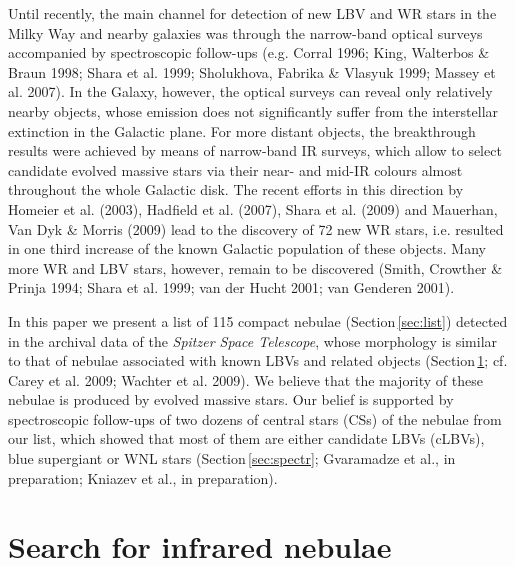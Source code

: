 \documentclass[useAMS]{mn2e}
\begin{document}
Until recently, the main channel for detection of new LBV and WR
stars in the Milky Way and nearby galaxies was through the
narrow-band optical surveys accompanied by spectroscopic follow-ups
(e.g. Corral 1996; King, Walterbos \& Braun 1998; Shara et al. 1999;
Sholukhova, Fabrika \& Vlasyuk 1999; Massey et al. 2007). In the
Galaxy, however, the optical surveys can reveal only relatively
nearby objects, whose emission does not significantly suffer from
the interstellar extinction in the Galactic plane. For more distant
objects, the breakthrough results were achieved by means of
narrow-band IR surveys, which allow to select candidate evolved
massive stars via their near- and mid-IR colours almost throughout
the whole Galactic disk. The recent efforts in this direction by
Homeier et al. (2003), Hadfield et al. (2007), Shara et al. (2009)
and Mauerhan, Van Dyk \& Morris (2009) lead to the discovery of 72
new WR stars, i.e. resulted in one third increase of the known
Galactic population of these objects. Many more WR and LBV stars,
however, remain to be discovered (Smith, Crowther \& Prinja 1994;
Shara et al. 1999; van der Hucht 2001; van Genderen 2001).

In this paper we present a list of 115 compact nebulae
(Section\,\ref{sec:list}) detected in the archival data of the {\it
Spitzer Space Telescope}, whose morphology is similar to that of
nebulae associated with known LBVs and related objects
(Section\,\ref{sec:search}; cf. Carey et al. 2009; Wachter et al.
2009). We believe that the majority of these nebulae is produced by
evolved massive stars. Our belief is supported by spectroscopic
follow-ups of two dozens of central stars (CSs) of the nebulae from
our list, which showed that most of them are either candidate LBVs
(cLBVs), blue supergiant or WNL stars (Section\,\ref{sec:spectr};
Gvaramadze et al., in preparation; Kniazev et al., in preparation).

\section{Search for infrared nebulae}
\label{sec:search}
\end{document}
